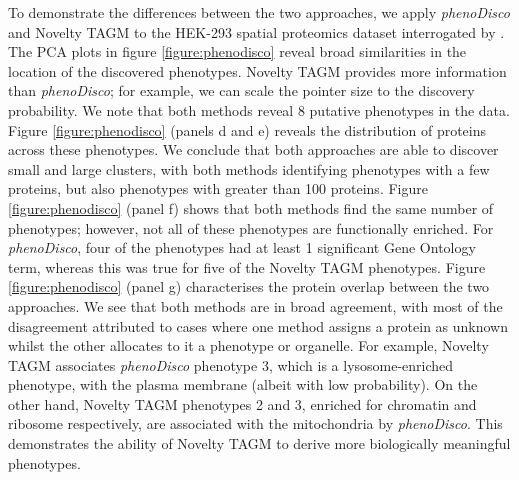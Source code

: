\documentclass[12pt,english]{article}
\begin{document}
To demonstrate the differences between the two approaches, we apply \textit{phenoDisco} and Novelty TAGM to the HEK-293 spatial proteomics dataset interrogated by \cite{Breckels:2013}. The PCA plots in figure \ref{figure:phenodisco} reveal broad similarities in the location of the discovered phenotypes. Novelty TAGM provides more information than \textit{phenoDisco}; for example, we can scale the pointer size to the discovery probability. We note that both methods reveal 8 putative phenotypes in the data. Figure \ref{figure:phenodisco} (panels d and e) reveals the distribution of proteins across these phenotypes. We conclude that both approaches are able to discover small and large clusters, with both methods identifying phenotypes with a few proteins, but also phenotypes with greater than 100 proteins. Figure \ref{figure:phenodisco} (panel f) shows that both methods find the same number of phenotypes; however, not all of these phenotypes are functionally enriched. For \textit{phenoDisco}, four of the phenotypes had at least 1 significant Gene Ontology term, whereas this was true for five of the Novelty TAGM phenotypes. Figure \ref{figure:phenodisco} (panel g) characterises the protein overlap between the two approaches. We see that both methods are in broad agreement, with most of the disagreement attributed to cases where one method assigns a protein as unknown whilst the other allocates to it a phenotype or organelle. For example, Novelty TAGM associates \textit{phenoDisco} phenotype 3, which is a lysosome-enriched phenotype, with the plasma membrane (albeit with low probability). On the other hand, Novelty TAGM phenotypes 2 and 3, enriched for chromatin and ribosome respectively, are associated with the mitochondria by \textit{phenoDisco}. This demonstrates the ability of Novelty TAGM to derive more biologically meaningful phenotypes.
\end{document}
